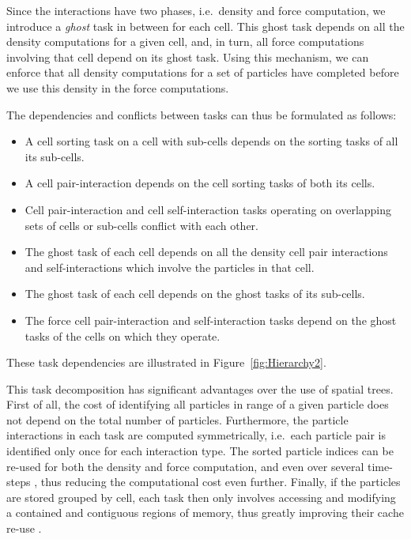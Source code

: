 \documentclass[final]{siamltex}
\newcommand{\fig}[1]
    {Figure~\ref{fig:#1}}
\begin{document}
Since the interactions have two phases, i.e.~density and force
computation, we introduce a {\em ghost} task in between for each cell.
This ghost task depends on all the density computations
for a given cell, and, in turn, all force computations involving
that cell depend on its ghost task.
Using this mechanism, we can enforce that all density computations
for a set of particles have completed before we use this
density in the force computations.

The dependencies and conflicts between tasks can thus be
formulated as follows:

\begin{itemize}

    \item A cell sorting task on a cell with sub-cells depends
        on the sorting tasks of all its sub-cells.

    \item A cell pair-interaction depends on the cell sorting
        tasks of both its cells.
        
    \item Cell pair-interaction and cell self-interaction tasks
        operating on overlapping sets of cells or sub-cells
        conflict with each other.
        
    \item The ghost task of each cell depends on all the density cell pair
        interactions and self-interactions which involve the particles
        in that cell.
        
    \item The ghost task of each cell depends on the ghost tasks of
        its sub-cells.
        
    \item The force cell pair-interaction and self-interaction tasks
        depend on the ghost tasks of the cells on which they operate.

\end{itemize}

\noindent These task dependencies are illustrated in \fig{Hierarchy2}.

This task decomposition has significant advantages over the use of
spatial trees.
First of all, the cost of identifying all particles in range of
a given particle does not depend on the total number of
particles.
Furthermore, the particle interactions in each task are computed
symmetrically, i.e.~each particle pair is identified only
once for each interaction type.
The sorted particle indices can be re-used for both the
density and force computation, and even over several time-steps
\cite{ref:Gonnet2013}, thus reducing the computational cost even
further.
Finally, if the particles are stored grouped by cell, each task
then only involves accessing and modifying a contained
and contiguous regions of memory, thus greatly improving their
cache re-use \cite{ref:Fomin2011}.
\end{document}
